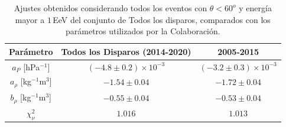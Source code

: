 \begin{table}[H]
  \centering
  \begin{tabular}{c|c|c}
  {Parámetro}                 & Todos los Disparos (2014-2020)& {2005-2015}    \cite{aab2017impact}              \\ \hline \hline
  $a_P$ [hPa$^{-1}$]          & $(-4.8 \pm 0.2)\times 10^{-3}$& $(-3.2 \pm 0.3)\times 10^{-3}$    \\ \hline
  $a_\rho$ [kg$^{-1}$m$^3$]   & $-1.54 \pm 0.04 $             & $-1.72 \pm 0.04$                  \\ \hline
  $b_\rho$ [kg$^{-1}$m$^3$]   & $-0.55 \pm 0.04$              & $-0.53 \pm 0.04$                  \\ \hline
  $\chi^2_\nu$                & $1.016$                       & $1.013$                           \\ 
  \end{tabular} 
  \caption{Ajustes obtenidos considerando todos los eventos con $\theta<60^o$ y energía mayor a $1\,$EeV del conjunto de Todos los disparos, comparados con los parámetros utilizados por la Colaboración.} \label{tabla:parametros_ALL}
\end{table}


